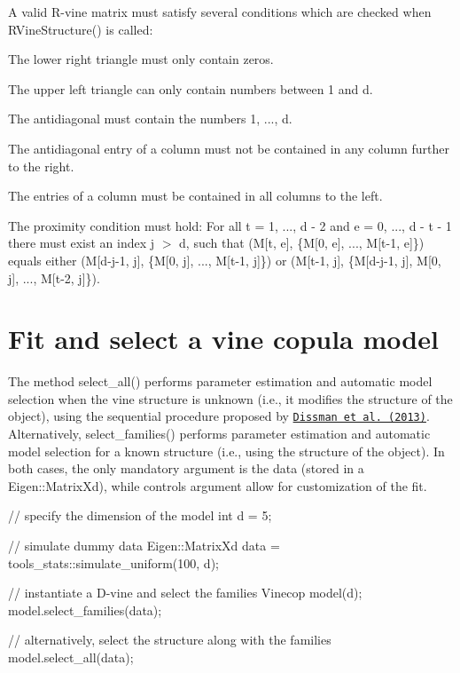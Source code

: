 A valid R-\/vine matrix must satisfy several conditions which are checked when {\ttfamily R\+Vine\+Structure()} is called\+:
\begin{DoxyEnumerate}
\item The lower right triangle must only contain zeros.
\item The upper left triangle can only contain numbers between 1 and d.
\item The antidiagonal must contain the numbers 1, ..., d.
\item The antidiagonal entry of a column must not be contained in any column further to the right.
\item The entries of a column must be contained in all columns to the left.
\item The proximity condition must hold\+: For all t = 1, ..., d -\/ 2 and e = 0, ..., d -\/ t -\/ 1 there must exist an index j $>$ d, such that {\ttfamily (M\mbox{[}t, e\mbox{]}, \{M\mbox{[}0, e\mbox{]}, ..., M\mbox{[}t-\/1, e\mbox{]}\})} equals either {\ttfamily (M\mbox{[}d-\/j-\/1, j\mbox{]}, \{M\mbox{[}0, j\mbox{]}, ..., M\mbox{[}t-\/1, j\mbox{]}\})} or {\ttfamily (M\mbox{[}t-\/1, j\mbox{]}, \{M\mbox{[}d-\/j-\/1, j\mbox{]}, M\mbox{[}0, j\mbox{]}, ..., M\mbox{[}t-\/2, j\mbox{]}\})}.
\end{DoxyEnumerate}\hypertarget{overview-vinecop_vinecop-fit}{}\section{Fit and select a vine copula model}\label{overview-vinecop_vinecop-fit}
The method {\ttfamily select\+\_\+all()} performs parameter estimation and automatic model selection when the vine structure is unknown (i.\+e., it modifies the structure of the object), using the sequential procedure proposed by \href{https://mediatum.ub.tum.de/doc/1079277/1079277.pdf}{\tt Dissman et al. (2013)}. Alternatively, {\ttfamily select\+\_\+families()} performs parameter estimation and automatic model selection for a known structure (i.\+e., using the structure of the object). In both cases, the only mandatory argument is the data (stored in a {\ttfamily Eigen\+::\+Matrix\+Xd}), while controls argument allow for customization of the fit. 
\begin{DoxyCode}
\textcolor{comment}{// specify the dimension of the model}
\textcolor{keywordtype}{int} d = 5;

\textcolor{comment}{// simulate dummy data}
Eigen::MatrixXd data = tools\_stats::simulate\_uniform(100, d);

\textcolor{comment}{// instantiate a D-vine and select the families}
Vinecop model(d);
model.select\_families(data);

\textcolor{comment}{// alternatively, select the structure along with the families}
model.select\_all(data);
\end{DoxyCode}


